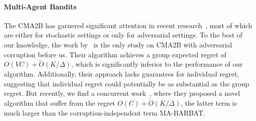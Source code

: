 \paragraph{Multi-Agent Bandits}
The CMA2B has garnered significant attention in recent research~\citep{cesa2016delay,chawla2020gossiping,huang2021federated,liu2021cooperative,wang2022achieving,chawla2022multiagent,chawla2023collaborative}, most of which are either for stochastic settings or only for adversarial settings. To the best of our knowledge, the work by~\cite{liu2021cooperative} is the only study on CMA2B with adversarial corruption before us. Their algorithm achieves a group expected regret of $O(VC) + \widetilde{O}(K / \Delta)$, which is significantly inferior to the performance of our algorithm. Additionally, their approach lacks guarantees for individual regret, suggesting that individual regret could potentially be as substantial as the group regret. But recently, we find a concurrent work~\citep{ghaffari2024multi}, where they proposed a novel algorithm that suffer from the regret $O(C) + \widetilde{O}(K / \Delta)$, the latter term is much larger than the corruption-independent term MA-BARBAT.
